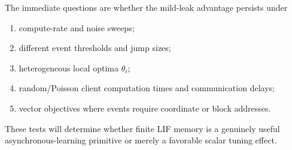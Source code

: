 The immediate questions are whether the mild-leak advantage persists under
\begin{enumerate}
  \item compute-rate and noise sweeps;
  \item different event thresholds and jump sizes;
  \item heterogeneous local optima $\theta_i$;
  \item random/Poisson client computation times and communication delays;
  \item vector objectives where events require coordinate or block addresses.
\end{enumerate}
These tests will determine whether finite LIF memory is a genuinely useful asynchronous-learning primitive or merely a favorable scalar tuning effect.
